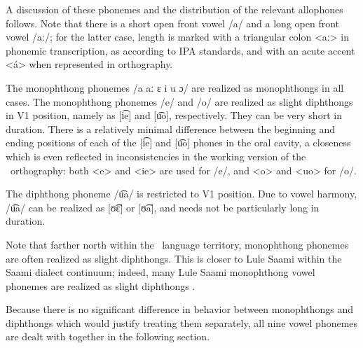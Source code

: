 
A discussion of these phonemes and the distribution of the relevant allophones follows. 
Note that there is a short open front vowel /a/ and a long open front vowel /aː/; for the latter case, length is marked with a triangular colon <aː> in phonemic transcription, as according to IPA standards, and with an acute accent <á> when represented in orthography.

The monophthong phonemes /a aː ɛ i u ɔ/ are realized as monophthongs in all cases. 
The monophthong phonemes /e/ and /o/ are realized as slight diphthongs in V1 position, namely as [i͡e] and [u͡o], %
respectively. They can be very short in duration. There is a relatively minimal difference between the beginning and ending positions of each of the [i͡e] and [u͡o] phones in the oral cavity, a closeness which is even reflected in inconsistencies in the working version of the \PS\ orthography: both <e> and <ie> are used for /e/, and <o> and <uo> for /o/. 

The diphthong phoneme /u͡a/ is restricted to V1 position. Due to vowel harmony, /u͡a/ can be realized as [ʊ͡ɛ] or [ʊ͡a], and needs not be particularly long in duration. 

Note that farther north within the \PS\ language territory, monophthong phonemes are often realized as slight diphthongs. This is closer to Lule Saami within the Saami dialect continuum; indeed, many Lule Saami monophthong vowel phonemes are realized as slight diphthongs \citep[cf., e.g.,~][11]{Spiik1989}. 

Because there is no significant difference in behavior between monophthongs and diphthongs which would justify treating them separately, all nine vowel phonemes are dealt with together in the following section.


